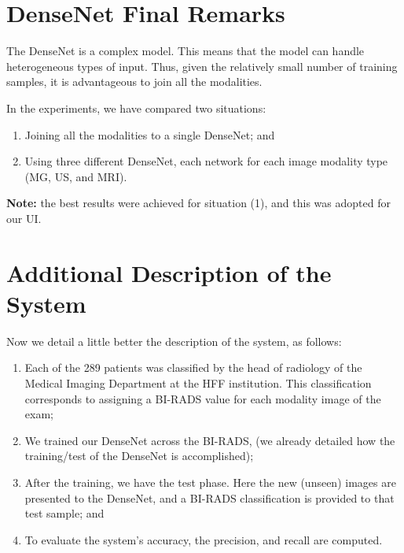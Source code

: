 \section{DenseNet Final Remarks}
\label{sec:app004006}

The DenseNet is a complex model.
This means that the model can handle heterogeneous types of input.
Thus, given the relatively small number of training samples, it is advantageous to join all the modalities.

\vspace{2.50mm}

\noindent
In the experiments, we have compared two situations:

\vspace{1.50mm}

\begin{enumerate}
\item Joining all the modalities to a single DenseNet; and
\item Using three different DenseNet, each network for each image modality type (\ac{MG}, \ac{US}, and \ac{MRI}).
\end{enumerate}

\vspace{1.50mm}

\noindent
{\bf Note:} the best results were achieved for situation (1), and this was adopted for our \ac{UI}.

\section{Additional Description of the System}
\label{sec:app004007}

\vspace{1.50mm}

\noindent
Now we detail a little better the description of the system, as follows:

\begin{enumerate}
\item Each of the 289 patients was classified by the head of radiology of the Medical Imaging Department at the \ac{HFF} institution.
This classification corresponds to assigning a \ac{BI-RADS} value for each modality image of the exam;
\item We trained our DenseNet across the \ac{BI-RADS}, (we already detailed how the  training/test of the DenseNet is accomplished);
\item After the training, we have the test phase.
Here the new (unseen) images are presented to the DenseNet, and a \ac{BI-RADS} classification is provided to that test sample; and
\item To evaluate the system's accuracy, the precision, and recall are computed.
\end{enumerate}

